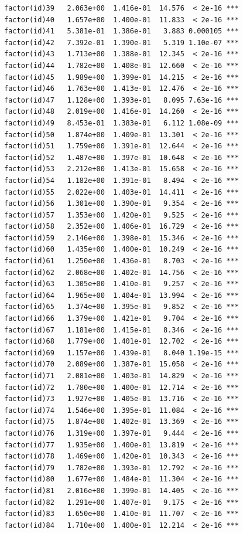 \documentclass[]{book}
\begin{document}
\begin{verbatim}
factor(id)39   2.063e+00  1.416e-01  14.576  < 2e-16 ***
factor(id)40   1.657e+00  1.400e-01  11.833  < 2e-16 ***
factor(id)41   5.381e-01  1.386e-01   3.883 0.000105 ***
factor(id)42   7.392e-01  1.390e-01   5.319 1.10e-07 ***
factor(id)43   1.713e+00  1.388e-01  12.345  < 2e-16 ***
factor(id)44   1.782e+00  1.408e-01  12.660  < 2e-16 ***
factor(id)45   1.989e+00  1.399e-01  14.215  < 2e-16 ***
factor(id)46   1.763e+00  1.413e-01  12.476  < 2e-16 ***
factor(id)47   1.128e+00  1.393e-01   8.095 7.63e-16 ***
factor(id)48   2.019e+00  1.416e-01  14.260  < 2e-16 ***
factor(id)49   8.453e-01  1.383e-01   6.112 1.08e-09 ***
factor(id)50   1.874e+00  1.409e-01  13.301  < 2e-16 ***
factor(id)51   1.759e+00  1.391e-01  12.644  < 2e-16 ***
factor(id)52   1.487e+00  1.397e-01  10.648  < 2e-16 ***
factor(id)53   2.212e+00  1.413e-01  15.658  < 2e-16 ***
factor(id)54   1.182e+00  1.391e-01   8.494  < 2e-16 ***
factor(id)55   2.022e+00  1.403e-01  14.411  < 2e-16 ***
factor(id)56   1.301e+00  1.390e-01   9.354  < 2e-16 ***
factor(id)57   1.353e+00  1.420e-01   9.525  < 2e-16 ***
factor(id)58   2.352e+00  1.406e-01  16.729  < 2e-16 ***
factor(id)59   2.146e+00  1.398e-01  15.346  < 2e-16 ***
factor(id)60   1.435e+00  1.400e-01  10.249  < 2e-16 ***
factor(id)61   1.250e+00  1.436e-01   8.703  < 2e-16 ***
factor(id)62   2.068e+00  1.402e-01  14.756  < 2e-16 ***
factor(id)63   1.305e+00  1.410e-01   9.257  < 2e-16 ***
factor(id)64   1.965e+00  1.404e-01  13.994  < 2e-16 ***
factor(id)65   1.374e+00  1.395e-01   9.852  < 2e-16 ***
factor(id)66   1.379e+00  1.421e-01   9.704  < 2e-16 ***
factor(id)67   1.181e+00  1.415e-01   8.346  < 2e-16 ***
factor(id)68   1.779e+00  1.401e-01  12.702  < 2e-16 ***
factor(id)69   1.157e+00  1.439e-01   8.040 1.19e-15 ***
factor(id)70   2.089e+00  1.387e-01  15.058  < 2e-16 ***
factor(id)71   2.081e+00  1.403e-01  14.829  < 2e-16 ***
factor(id)72   1.780e+00  1.400e-01  12.714  < 2e-16 ***
factor(id)73   1.927e+00  1.405e-01  13.716  < 2e-16 ***
factor(id)74   1.546e+00  1.395e-01  11.084  < 2e-16 ***
factor(id)75   1.874e+00  1.402e-01  13.369  < 2e-16 ***
factor(id)76   1.319e+00  1.397e-01   9.444  < 2e-16 ***
factor(id)77   1.935e+00  1.400e-01  13.819  < 2e-16 ***
factor(id)78   1.469e+00  1.420e-01  10.343  < 2e-16 ***
factor(id)79   1.782e+00  1.393e-01  12.792  < 2e-16 ***
factor(id)80   1.677e+00  1.484e-01  11.304  < 2e-16 ***
factor(id)81   2.016e+00  1.399e-01  14.405  < 2e-16 ***
factor(id)82   1.291e+00  1.407e-01   9.175  < 2e-16 ***
factor(id)83   1.650e+00  1.410e-01  11.707  < 2e-16 ***
factor(id)84   1.710e+00  1.400e-01  12.214  < 2e-16 ***

\end{verbatim}
\end{document}
